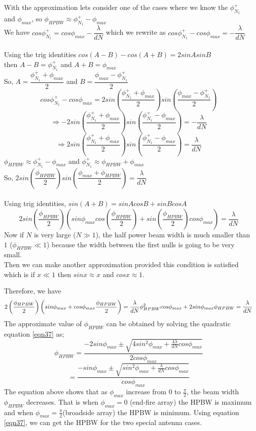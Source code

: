 With the approximation lets consider one of the cases where we know the $\phi_{N_1}^{+}$ and $\phi_{max}$, so $\phi_{HPBW} \approx \phi_{N_1}^{+} - \phi_{max} $ \\ 
We have $cos\phi_{N_1}^{+} = cos\phi_{max} - \dfrac{\lambda}{dN}$ which we rewrite as $cos\phi_{N_1}^{+} - cos\phi_{max} = - \dfrac{\lambda}{dN}$ \\ \\
Using the trig identities $cos(A - B) -cos(A + B) = 2sinAsinB$ \\ 
then $A - B = \phi_{N_1}^{+}$ and  $A + B = \phi_{max}$ \\ 
So, $ A = \dfrac{\phi_{N_1}^{+} + \phi_{max}}{2}$ and $B =  \dfrac{\phi_{max} - \phi_{N_1}^{+}}{2} $
$$cos\phi_{N_1}^{+} - cos\phi_{max} = 2sin (\dfrac{\phi_{N_1}^{+} + \phi_{max}}{2}) sin(\dfrac{\phi_{max} - \phi_{N_1}^{+}}{2})$$
$$ \Rightarrow  -2sin (\dfrac{\phi_{N_1}^{+} + \phi_{max}}{2}) sin(\dfrac{\phi_{N_1}^{+} - \phi_{max}}{2}) = - \dfrac{\lambda}{dN}$$ 
$$ \Rightarrow  2sin (\dfrac{\phi_{N_1}^{+} + \phi_{max}}{2}) sin(\dfrac{\phi_{N_1}^{+} - \phi_{max}}{2}) =  \dfrac{\lambda}{dN}$$
$\phi_{HPBW} \approx \phi_{N_1}^{+} - \phi_{max} $ and $\phi_{N_1}^{+} \approx \phi_{HPBW} + \phi_{max}$ \\
So, $2sin(\dfrac{\phi_{HPBW}}{2})sin(\dfrac{\phi_{max} + \phi_{HPBW}}{2}) = \dfrac{\lambda}{dN}$ \\ \\
Using trig identities, $sin(A+B) = sinAcosB + sinBcosA $ 
$$ 2sin(\dfrac{\phi_{HPBW}}{2})(sin\phi_{max}cos(\dfrac{\phi_{HPBW}}{2}) + sin(\dfrac{\phi_{HPBW}}{2})cos\phi_{max}) = \dfrac{\lambda}{dN} $$
Now if $N$ is very large ($N \gg 1$), the half power beam width is much smaller than $1$ ($\phi_{HPBW} \ll 1$) because the width between the first nulls is going to be very small. \\
Then we can make another approximation provided this condition is satisfied which is if  $x\ll1$ then $sinx \approx x$ and $cos x \approx 1$.

Therefore, we have 
\begin{equation}
2\left(\dfrac{\phi_{HPBW}}{2}\right)\left(sin\phi_{max} + cos\phi_{max}\dfrac{\phi_{HPBW}}{2}\right) = \dfrac{\lambda}{dN}$$ 
$$ \phi^2_{HPBW}cos\phi_{max} + 2sin\phi_{max}\phi_{HPBW} = \dfrac{\lambda}{dN}
\label{eqn37}
\end{equation}
The approximate value of $\phi_{HPBW}$ can be obtained by solving the quadratic equation \ref{eqn37} as;
$$ \phi_{HPBW} = \dfrac{-2sin\phi_{max}\pm\sqrt{4sin^2\phi_{max} + \frac{4\lambda}{dN}cos\phi_{max}}}{2cos\phi_{max}}$$
$$ = \dfrac{-sin\phi_{max}\pm\sqrt{sin^2\phi_{max} + \frac{\lambda}{dN}cos\phi_{max}}}{cos\phi_{max}} $$
The equation above shows that as $\phi_{max}$ increase from $0$ to $\frac{\pi}{2}$, the beam width $\phi_{HPBW}$ decreases. That is when $\phi_{max} = 0$ (end-fire array) the HPBW is maximum and when $\phi_{max} = \frac{\pi}{2}$(broadside array) the HPBW  is minimum. Using equation \ref{eqn37}, we can get the HPBW for the two special antenna cases. 

